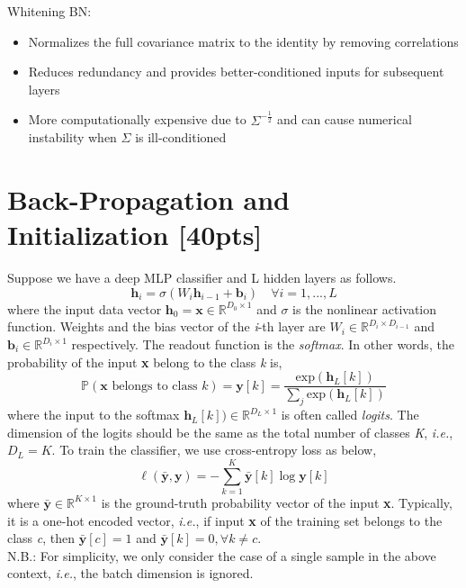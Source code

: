 \documentclass{article}
\begin{document}
{\noindent
Whitening BN:
\begin{itemize}
    \item Normalizes the full covariance matrix to the identity by removing correlations
    \item Reduces redundancy and provides better-conditioned inputs for subsequent layers
    \item More computationally expensive due to $\Sigma^{-\frac{1}{2}}$ and can cause numerical instability when $\Sigma$ is ill-conditioned
\end{itemize}
}

\section{Back-Propagation and Initialization [40pts]}
\noindent
Suppose we have a deep MLP classifier and L hidden layers as follows.
\begin{equation}
    \textbf{h}_i=\sigma (W_i \textbf{h}_{i-1}+ \textbf{b}_i) \quad \forall i=1,...,L
\end{equation}
where the input data vector $\textbf{h}_0= \textbf{x} \in \mathbb{R}^{D_0 \times 1}$ and $\sigma$ is the nonlinear activation function. Weights and the bias vector of the \textit{i}-th layer are $W_i \in \mathbb{R}^{D_i \times D_{i-1}}$ and $\textbf{b}_i \in \mathbb{R}^{D_i \times 1}$ respectively. The readout
function is the \textit{softmax}. In other words, the probability of the input \textbf{x} belong to the class \textit{k} is,
\begin{equation}
    \mathbb{P}(\textbf{x} \text{ belongs to class } k)= \textbf{y}[k]= \frac{\text{exp}(\textbf{h}_L[k])}{\sum_j \text{exp}(\textbf{h}_L[k])}
\end{equation}
where the input to the softmax $\textbf{h}_L[k]) \in \mathbb{R}^{D_L \times 1}$ is often called \textit{logits}. The dimension of the logits should be the same as the total number of classes \textit{K}, \textit{i.e.}, $D_L = K$. To train the classifier, we use cross-entropy loss as below,
\begin{equation}
    \ell (\bar{\textbf{y}},\textbf{y})=- \sum_{k=1}^{K} \bar{\textbf{y}}[k] \log \textbf{y}[k]
\end{equation}
where $\bar{\textbf{y}} \in \mathbb{R}^{K \times 1}$ is the ground-truth probability vector of the input \textbf{x}. Typically, it is a one-hot encoded vector, \textit{i.e.}, if input \textbf{x} of the training set belongs to the class \textit{c}, then $\bar{\textbf{y}}[c]=1$ and
$\bar{\textbf{y}}[k]=0, \forall k \neq c$. \\
N.B.: For simplicity, we only consider the case of a single sample in the above context, \textit{i.e.}, the
batch dimension is ignored.\\
\end{document}
